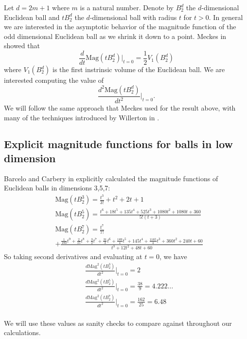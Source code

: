 \documentclass[11pt]{article}
\theoremstyle{definition}
\theoremstyle{definition}
\theoremstyle{plain}
\theoremstyle{plain}
\theoremstyle{plain}
\theoremstyle{definition}
\begin{document}
Let $d = 2m+1$ where $m$ is a natural number. Denote by $B_2^d$ the $d$-dimensional Euclidean ball and $tB_2^d$ the $d$-dimensional ball with radius $t$ for $t > 0$. In general we are interested in the asymptotic behavior of the magnitude function of the odd dimensional Euclidean ball as we shrink it down to a point. Meckes in \cite{meckes_magnitude_2019} showed that
\begin{equation*}
\frac{d}{dt}\text{Mag}(tB_2^d)\big\vert_{t=0} = \frac{1}{2}V_1(B_2^d)
\end{equation*}
where $V_1(B_2^d)$ is the first instrinsic volume of the Euclidean ball.
We are interested computing the value of
\begin{equation*}
\frac{d^2\text{Mag}(tB_2^d)}{dt^2}\big\vert_{t=0}.
\end{equation*}
We will follow the same approach that Meckes used for the result above, with many of the techniques introduced by Willerton in \cite{willerton_magnitude_2017}.

\subsection{Explicit magnitude functions for balls in low dimension}

Barcelo and Carbery in \cite{barcelo_magnitudes_2016} explicitly calculated the magnitude functions of Euclidean balls in dimensions 3,5,7:
\begin{align*}
&\text{Mag}(tB_2^3) = \frac{t^3}{3!}+t^2+2t+1 \\
&\text{Mag}(tB_2^5) = \frac{t^6+18t^5+135t^4+525t^3+1080t^2+1080t+360}{5!(t+3)} \\
&\text{Mag}(tB_2^7) = \frac{t^7}{7!} \\
&+ \frac{\frac{1}{180}t^9+\frac{2}{15}t^8+\frac{3}{2}t^7+\frac{31}{3}t^6+\frac{189}{4}t^5+145t^4+\frac{1165}{4}t^3+360t^2+240t+60}{t^3+12t^2+48t+60}
\end{align*}
So taking second derivatives and evaluating at $t = 0$, we have
\begin{align*}
&\frac{d\text{Mag}^2(tB_2^3)}{dt^2}\big\vert_{t=0} = 2 \\
&\frac{d\text{Mag}^2(tB_2^5)}{dt^2}\big\vert_{t=0} = \frac{38}{9} = 4.222\dots \\
&\frac{d\text{Mag}^2(tB_2^7)}{dt^2}\big\vert_{t=0} = \frac{162}{25} = 6.48 \\
\end{align*}

We will use these values as sanity checks to compare against throughout our calculations.
\end{document}
